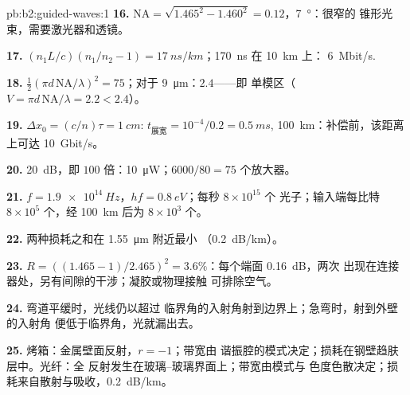 \begin{solution}{pb:b2:guided-waves:1}
\textbf{16.} $\mathrm{NA} = \sqrt{1.465^2 - 1.460^2} = 0.12$，\qty{7}{\degree}：很窄的
锥形光束，需要激光器和透镜。

\textbf{17.} $(n_1L/c)(n_1/n_2 - 1) = \qty{17}{ns/km}$；\qty{170}{ns} 在 \qty{10}{km} 上：
\qty{6}{Mbit/s}.

\textbf{18.} $\tfrac12(\pi d\,\mathrm{NA}/\lambda)^2 = 75$；对于 \qty{9}{\micro m}：$2.4$——即
单模区（$V = \pi d\,\mathrm{NA}/\lambda = 2.2 < 2.4$）。

\textbf{19.} $\Delta x_0 = (c/n)\tau = \qty{1}{cm}$: $t_{\text{展宽}} = 10^{-4}/0.2 = \qty{0.5}{ms}$,
\qty{100}{km}：补偿前，该距离上可达 \qty{10}{Gbit/s}。

\textbf{20.} \qty{20}{dB}，即 $100$ 倍：\qty{10}{\micro W}；$6000/80 = 75$
个放大器。

\textbf{21.} $f = \qty{1.9e14}{Hz}$，$hf = \qty{0.8}{eV}$；每秒 $8 \times 10^{15}$ 个
光子；输入端每比特 $8 \times 10^5$ 个，经 \qty{100}{km} 后为 $8 \times 10^3$ 个。

\textbf{22.} 两种损耗之和在 \qty{1.55}{\micro m} 附近最小
（\qty{0.2}{dB/km}）。

\textbf{23.} $R = ((1.465 - 1)/2.465)^2 = 3.6\%$：每个端面 \qty{0.16}{dB}，两次
出现在连接器处，另有间隙的干涉；凝胶或物理接触
可排除空气。

\textbf{24.} 弯道平缓时，光线仍以超过
临界角的入射角射到边界上；急弯时，射到外壁的入射角
便低于临界角，光就漏出去。

\textbf{25.} 烤箱：金属壁面反射，$r = -1$；带宽由
谐振腔的模式决定；损耗在钢壁趋肤层中。光纤：全
反射发生在玻璃–玻璃界面上；带宽由模式与
色度色散决定；损耗来自散射与吸收，\qty{0.2}{dB/km}。
\end{solution}
